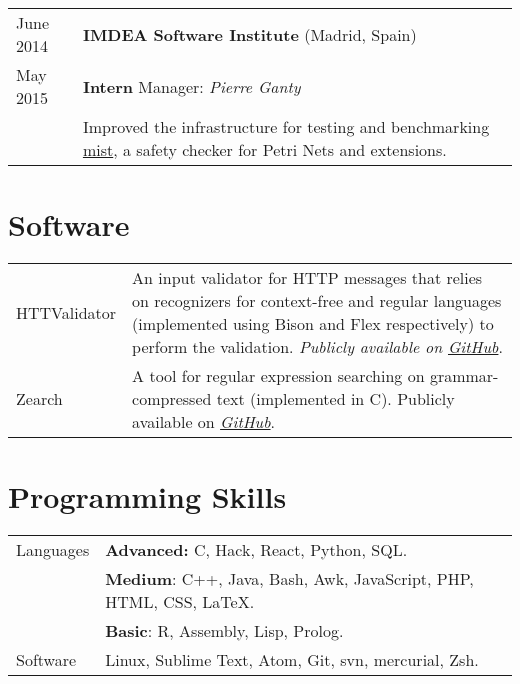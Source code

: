 \documentclass[a4paper,10pt]{article} %
\begin{document}
\begin{tabular}{p{2.5cm}p{13.2cm}}
{\small June 2014} & \textbf{IMDEA Software Institute} (Madrid, Spain) \\
{\small May 2015} & \textcolor{azureblue}{\textbf{Intern}} \hfill Manager: \emph{Pierre Ganty}\\
& Improved the infrastructure for testing and benchmarking \href{https://github.com/pierreganty/mist/wiki}{mist}, a safety checker for Petri Nets and extensions.
\end{tabular}

\section{Software}

\begin{tabular}{p{2.5cm}p{13.2cm}}
{\small HTTValidator} & An input validator for HTTP messages that relies on recognizers for context-free and regular languages (implemented using Bison and Flex respectively) to perform the validation. \emph{Publicly available on \href{https://github.com/pevalme/HTTPValidator}{GitHub}}. \\

{\small Zearch} & A tool for regular expression searching on grammar-compressed text (implemented in C). Publicly available on \emph{\href{https://github.com/pevalme/zearch}{GitHub}}.\\
\end{tabular}

\section{Programming Skills}
\begin{tabular}{p{2.5cm}p{13.2cm}}
\small{Languages} & \textcolor{azureblue}{\textbf{Advanced:}} C, Hack, React, Python, SQL.\\
[1pt]
& \textcolor{battleshipgrey}{\textbf{Medium}}: C++, Java, Bash, Awk, JavaScript, PHP, HTML, CSS, \LaTeX.\\
& \textbf{Basic}: R, Assembly, Lisp, Prolog.\\
[3pt]
\small{Software} & Linux, Sublime Text, Atom, Git, svn, mercurial, Zsh.\\
\end{tabular}
\end{document}
